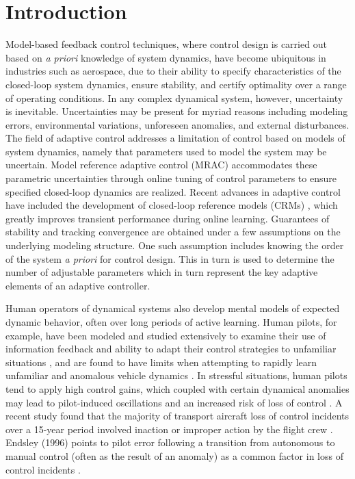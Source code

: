 \chapter{Introduction} \label{ch:introduction}

Model-based feedback control techniques, where control design is carried out based on \textit{a priori} knowledge of system dynamics, have become ubiquitous in industries such as aerospace, due to their ability to specify characteristics of the closed-loop system dynamics, ensure stability, and certify optimality over a range of operating conditions. In any complex dynamical system, however, uncertainty is inevitable. Uncertainties may be present for myriad reasons including modeling errors, environmental variations, unforeseen anomalies, and external disturbances. The field of adaptive control addresses a limitation of control based on models of system dynamics, namely that parameters used to model the system may be uncertain. Model reference adaptive control (MRAC) \cite{narendra2012stable, lavretsky2013robust} accommodates these parametric uncertainties through online tuning of control parameters to ensure specified closed-loop dynamics are realized. Recent advances in adaptive control have included the development of closed-loop reference models (CRMs) \cite{gibson2013adaptive}, which greatly improves transient performance during online learning. Guarantees of stability and tracking convergence are obtained under a few assumptions on the underlying modeling structure. One such assumption includes knowing the order of the system \textit{a priori} for control design. This in turn is used to determine the number of adjustable parameters which in turn represent the key adaptive elements of an adaptive controller.

Human operators of dynamical systems also develop mental models of expected dynamic behavior, often over long periods of active learning. Human pilots, for example, have been modeled and studied extensively to examine their use of information feedback and ability to adapt their control strategies to unfamiliar situations \cite{mcruer1967review, phatak1969model}, and are found to have limits when attempting to rapidly learn unfamiliar and anomalous vehicle dynamics \cite{hess2012modeling, hess2015modeling, endsley1995toward, zaal2016manual, oliver2017cognition}. In stressful situations, human pilots tend to apply high control gains, which coupled with certain dynamical anomalies may lead to pilot-induced oscillations and an increased risk of loss of control \cite{hess1997unified}. A recent study found that the majority of transport aircraft loss of control incidents over a 15-year period involved inaction or improper action by the flight crew \cite{belcastro2014preliminary} . Endsley (1996) points to pilot error following a transition from autonomous to manual control (often as the result of an anomaly) as a common factor in loss of control incidents \cite{endsley1996automation}. 

